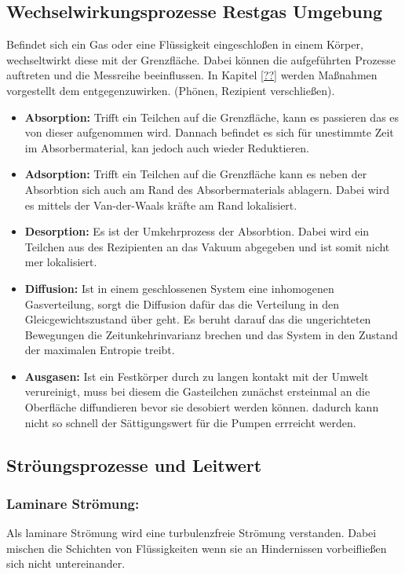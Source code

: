 \subsection{Wechselwirkungsprozesse Restgas Umgebung}
Befindet sich ein Gas oder eine Flüssigkeit eingeschloßen in einem Körper, wechseltwirkt diese mit der Grenzfläche. Dabei können die aufgeführten Prozesse auftreten und die Messreihe beeinflussen. In Kapitel \ref{??} werden Maßnahmen vorgestellt dem entgegenzuwirken. (Phönen, Rezipient verschließen).
\begin{itemize}
  \item \textbf{Absorption:} Trifft ein Teilchen auf die Grenzfläche, kann es passieren das es von dieser aufgenommen wird. Dannach befindet es sich für unestimmte Zeit im Absorbermaterial, kan jedoch auch wieder Reduktieren.
  \item \textbf{Adsorption:} Trifft ein Teilchen auf die Grenzfläche kann es neben der Absorbtion sich auch am Rand des Absorbermaterials ablagern. Dabei wird es mittels der Van-der-Waals kräfte am Rand lokalisiert.
  \item \textbf{Desorption:} Es ist der Umkehrprozess der Absorbtion. Dabei wird ein Teilchen aus des Rezipienten an das Vakuum abgegeben und ist somit nicht mer lokalisiert. 
  \item \textbf{Diffusion:} Ist in einem geschlossenen System eine inhomogenen Gasverteilung, sorgt die Diffusion dafür das die Verteilung in den Gleicgewichtszustand über geht. Es beruht darauf das die ungerichteten Bewegungen die Zeitunkehrinvarianz brechen und das System in den Zustand der maximalen Entropie treibt.
  \item \textbf{Ausgasen:} Ist ein Festkörper durch zu langen kontakt mit der Umwelt verureinigt, muss bei diesem die Gasteilchen zunächst ersteinmal an die Oberfläche diffundieren bevor sie desobiert werden können. dadurch kann nicht so schnell der Sättigungswert für die Pumpen errreicht werden.
\end{itemize}
\subsection{Ströungsprozesse und Leitwert}

\subsubsection{Laminare Strömung:}
Als laminare Strömung wird eine turbulenzfreie Strömung verstanden. Dabei mischen die Schichten von Flüssigkeiten wenn sie an Hindernissen vorbeifließen sich nicht untereinander.

